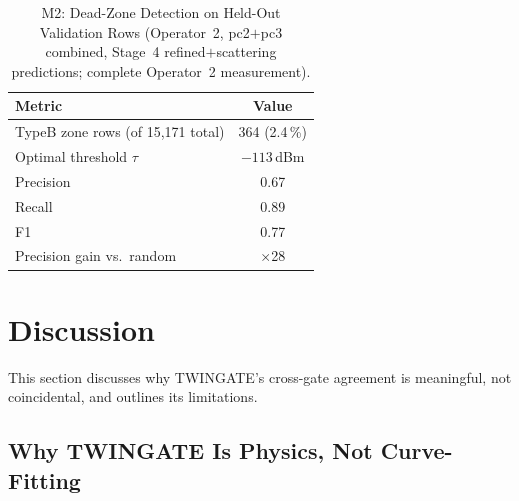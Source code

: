 \documentclass[conference]{IEEEtran}
\begin{document}
\begin{table}[!t]
  \centering
  \caption{M2: Dead-Zone Detection on Held-Out Validation Rows (Operator~2,
           pc2$+$pc3 combined, Stage~4 refined$+$scattering predictions;
           complete Operator~2 measurement).}
  \label{tab:m2}
  \renewcommand{\arraystretch}{1.1}
  \begin{tabular}{lc}
    \toprule
    Metric & Value \\
    \midrule
    TypeB zone rows (of 15,171 total) & 364 (2.4\,\%) \\
    Optimal threshold $\tau$          & $-113$\,dBm \\
    Precision                         & 0.67 \\
    Recall                            & 0.89 \\
    F1                                & 0.77 \\
    \midrule
    Precision gain vs.\ random        & $\times$28 \\
    \bottomrule
  \end{tabular}
  \vspace{-2mm}
\end{table}

\section{Discussion}
\label{sec:discussion}

This section discusses why TWINGATE's cross-gate agreement is
meaningful, not coincidental, and outlines its limitations.

\subsection{Why TWINGATE Is Physics, Not Curve-Fitting}
\end{document}
